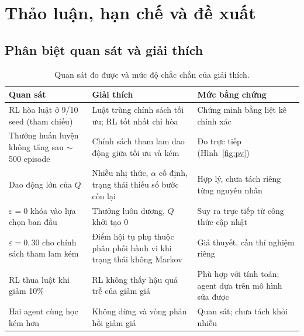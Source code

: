 \documentclass[12pt,a4paper]{report}
\begin{document}
\chapter{Thảo luận, hạn chế và đề xuất}
\label{chap:discussion}

\section{Phân biệt quan sát và giải thích}
\begin{table}[H]
\centering
\small
\caption{Quan sát đo được và mức độ chắc chắn của giải thích.}
\begin{tabularx}{\textwidth}{XX>{\raggedright\arraybackslash}p{4.3cm}}
\toprule
Quan sát & Giải thích & Mức bằng chứng \\
\midrule
RL hòa luật ở 9/10 seed (tham chiếu) & Luật trùng chính sách tối ưu; RL tốt nhất chỉ hòa & Chứng minh bằng liệt kê chính xác \\
Thưởng huấn luyện không tăng sau $\sim$500 episode & Chính sách tham lam dao động giữa tối ưu và kém & Đo trực tiếp (Hình~\ref{fig:pv}) \\
Dao động lớn của $Q$ & Nhiễu nhị thức, $\alpha$ cố định, trạng thái thiếu số bước còn lại & Hợp lý, chưa tách riêng từng nguyên nhân \\
$\varepsilon=0$ khóa vào lựa chọn ban đầu & Thưởng luôn dương, $Q$ khởi tạo 0 & Suy ra trực tiếp từ công thức cập nhật \\
$\varepsilon=0{,}30$ cho chính sách tham lam kém & Điểm hội tụ phụ thuộc phân phối hành vi khi trạng thái không Markov & Giả thuyết, cần thí nghiệm riêng \\
RL thua luật khi giảm 10\% & RL không thấy hậu quả trễ của giảm giá & Phù hợp với tính toán; agent dựa trên mô hình sửa được \\
Hai agent cùng học kém hơn & Không dừng và vòng phản hồi giảm giá & Quan sát; chưa tách khỏi nhiễu \\
\bottomrule
\end{tabularx}
\end{table}
\end{document}
